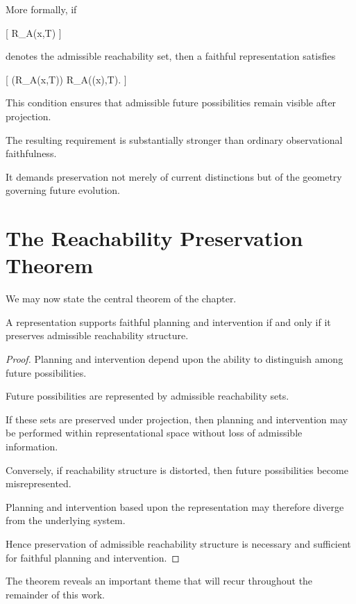 \documentclass[11pt,oneside,openany]{book}
\begin{document}
More formally, if

[
R_A(x,T)
]

denotes the admissible reachability set, then a faithful representation satisfies

[
\pi(R_A(x,T))
\approx
R_A(\pi(x),T).
]

This condition ensures that admissible future possibilities remain visible after projection.

The resulting requirement is substantially stronger than ordinary observational faithfulness.

It demands preservation not merely of current distinctions but of the geometry governing future evolution.

\section{The Reachability Preservation Theorem}

We may now state the central theorem of the chapter.

\begin{theorem}

A representation supports faithful planning and intervention if and only if it preserves admissible reachability structure.

\end{theorem}

\begin{proof}

Planning and intervention depend upon the ability to distinguish among future possibilities.

Future possibilities are represented by admissible reachability sets.

If these sets are preserved under projection, then planning and intervention may be performed within representational space without loss of admissible information.

Conversely, if reachability structure is distorted, then future possibilities become misrepresented.

Planning and intervention based upon the representation may therefore diverge from the underlying system.

Hence preservation of admissible reachability structure is necessary and sufficient for faithful planning and intervention.

\end{proof}

The theorem reveals an important theme that will recur throughout the remainder of this work.
\end{document}

